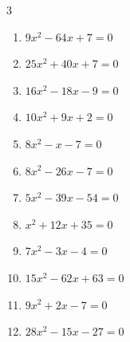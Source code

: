 \begin{multicols}{3}
\begin{enumerate}

  \item $9x^{2}-64x+7=0$


  \item $25x^{2}+40x+7=0$


  \item $16x^{2}-18x-9=0$


  \item $10x^{2}+9x+2=0$


  \item $8x^{2}-x-7=0$


  \item $8x^{2}-26x-7=0$


  \item $5x^{2}-39x-54=0$


  \item $x^{2}+12x+35=0$

        \phantom{$\displaystyle x=-7,\; -5$}

\columnbreak %

\resetques

  \item $7x^{2}-3x-4=0$


  \item $15x^{2}-62x+63=0$


  \item $9x^{2}+2x-7=0$


  \item $28x^{2}-15x-27=0$



\end{enumerate}
\end{multicols}
